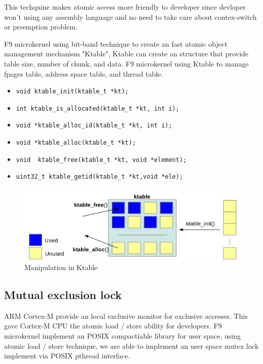 \documentclass[10pt,preprint,nocopyrightspace]{sigplanconf}
\begin{document}
This techquine makes atomic access more friendly to developer since devloper won't using any assembly language and no need to take care about contex-switch or preemption problem.

F9 microkernel using bit-band technique to create an fast atomic object management mechanism "Ktable", Ktable can create an structure that provide table size, number of chunk, and data. F9 microkernel using Ktable to manage fpages table, address space table, and thread table.

\begin{itemize}
\footnotesize
\item \verb|void ktable_init(ktable_t *kt);|
\item \verb|int ktable_is_allocated(ktable_t *kt, int i);|
\item \verb|void *ktable_alloc_id(ktable_t *kt, int i);|
\item \verb|void *ktable_alloc(ktable_t *kt);|
\item \verb|void  ktable_free(ktable_t *kt, void *element);|
\item \verb|uint32_t ktable_getid(ktable_t *kt,void *ele);|
\end{itemize}


\begin{figure}[H]
	\begin{center}
		\includegraphics[width=\linewidth]{picture/ktable.png}
	\end{center}
	\caption{Manipulation in Ktable\cite{ncku2015}}
\end{figure}

\subsection{Mutual exclusion lock}
ARM Cortex-M provide an local exclusive monitor for exclusive accesses. This gave Cortex-M CPU the atomic load / store ability for developers\cite{arm2012v7}. F9 microkernel implement an POSIX compactiable library for user space, using atomic load / store technique, we are able to implement an user space mutex lock implement via POSIX pthread interface.
\end{document}
